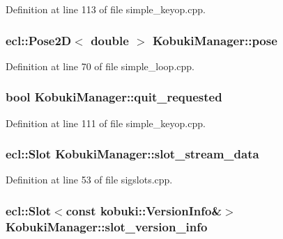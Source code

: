 \-Definition at line 113 of file simple\-\_\-keyop.\-cpp.

\subsubsection[{pose}]{\setlength{\rightskip}{0pt plus 5cm}ecl\-::\-Pose2\-D$<$ double $>$ {\bf \-Kobuki\-Manager\-::pose}\hspace{0.3cm}{\ttfamily  [private]}}\label{classKobukiManager_aa854734e3ebf2638c3be4d93c162257f}


\-Definition at line 70 of file simple\-\_\-loop.\-cpp.

\subsubsection[{quit\-\_\-requested}]{\setlength{\rightskip}{0pt plus 5cm}bool {\bf \-Kobuki\-Manager\-::quit\-\_\-requested}\hspace{0.3cm}{\ttfamily  [private]}}\label{classKobukiManager_a27843ea73f286051aa48ab6af140c073}


\-Definition at line 111 of file simple\-\_\-keyop.\-cpp.

\subsubsection[{slot\-\_\-stream\-\_\-data}]{\setlength{\rightskip}{0pt plus 5cm}ecl\-::\-Slot {\bf \-Kobuki\-Manager\-::slot\-\_\-stream\-\_\-data}\hspace{0.3cm}{\ttfamily  [private]}}\label{classKobukiManager_a932be6e61aa406bc1a33c12281bc4499}


\-Definition at line 53 of file sigslots.\-cpp.

\subsubsection[{slot\-\_\-version\-\_\-info}]{\setlength{\rightskip}{0pt plus 5cm}ecl\-::\-Slot$<$const {\bf kobuki\-::\-Version\-Info}\&$>$ {\bf \-Kobuki\-Manager\-::slot\-\_\-version\-\_\-info}\hspace{0.3cm}{\ttfamily  [private]}}\label{classKobukiManager_a3e2ed71aaa1c0bd70840322114076169}


